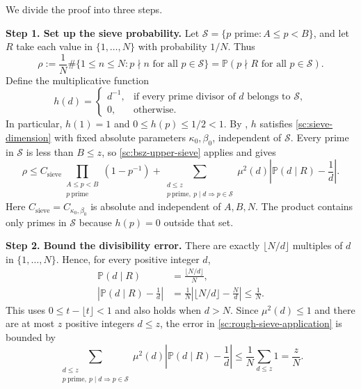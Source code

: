 \documentclass[twoside]{aomart}
\makeatletter
\theoremstyle{paperplain}
\theoremstyle{paperdefinition}
\renewenvironment{proof}[1][\proofname]{\par\pushQED{\qed}%
  \normalfont\topsep6\p@\@plus3\p@\relax\trivlist
  \item[\hskip\labelsep\itshape #1\@addpunct{.}]\ignorespaces
}{\popQED\endtrivlist\@endpefalse}
\numberwithin{equation}{section}
\makeatother
\begin{document}
\begin{proof}
We divide the proof into three steps.

\medskip
\noindent\textbf{Step 1. Set up the sieve probability.}
Let $\mathcal S=\{p\text{ prime}:A\le p<B\}$, and let $R$ take
each value in $\{1,\ldots,N\}$ with probability $1/N$. Thus
\begin{equation}
 \rho:=\frac1N\#\{1\le n\le N:p\nmid n\text{ for all }p\in\mathcal S\}=\mathbb P(p\nmid R\text{ for all }p\in\mathcal S).
 \label{sc:rough-count-probability}
\end{equation}
Define the multiplicative function
\begin{equation*}
 h(d)=
 \begin{cases}
 d^{-1},&\text{if every prime divisor of }d\text{ belongs to }\mathcal S,\\
 0,&\text{otherwise}.
 \end{cases}
\end{equation*}
In particular, $h(1)=1$ and $0\le h(p)\le1/2<1$.
By , $h$ satisfies
\eqref{sc:sieve-dimension} with fixed absolute parameters
$\kappa_0,\beta_0$, independent of $\mathcal S$.
Every prime in $\mathcal S$ is less than $B\le z$, so
\eqref{sc:bsz-upper-sieve} applies and gives
\begin{equation}
 \rho\le C_{\mathrm{sieve}}\prod_{\substack{A\le p<B\\p\ \mathrm{prime}}}(1-p^{-1})
 +\sum_{\substack{d\le z\\p\ \mathrm{prime},\ p\mid d\Rightarrow p\in\mathcal S}}
       \mu^2(d)\left|\mathbb P(d\mid R)-\frac1d\right|.
 \label{sc:rough-sieve-application}
\end{equation}
Here $C_{\mathrm{sieve}}=C_{\kappa_0,\beta_0}$ is absolute and
independent of $A,B,N$. The product contains only primes in
$\mathcal S$ because $h(p)=0$ outside that set.

\medskip
\noindent\textbf{Step 2. Bound the divisibility error.}
There are exactly $\lfloor N/d\rfloor$ multiples of $d$ in
$\{1,\ldots,N\}$. Hence, for every positive integer $d$,
\begin{equation*}
 \begin{aligned}
 \mathbb P(d\mid R)&=\frac{\lfloor N/d\rfloor}{N},\\
 \left|\mathbb P(d\mid R)-\frac1d\right|
 &=\frac1N\left|\lfloor N/d\rfloor-\frac Nd\right|\le\frac1N.
 \end{aligned}
\end{equation*}
This uses $0\le t-\lfloor t\rfloor<1$ and also holds when $d>N$.
Since $\mu^2(d)\le1$ and there are at most $z$ positive integers
$d\le z$, the error in \eqref{sc:rough-sieve-application} is bounded by
\begin{equation}
 \sum_{\substack{d\le z\\p\ \mathrm{prime},\ p\mid d\Rightarrow p\in\mathcal S}}
       \mu^2(d)\left|\mathbb P(d\mid R)-\frac1d\right|
 \le\frac1N\sum_{d\le z}1=\frac zN.
 \label{sc:rough-total-error}
\end{equation}


\end{proof}
\end{document}

